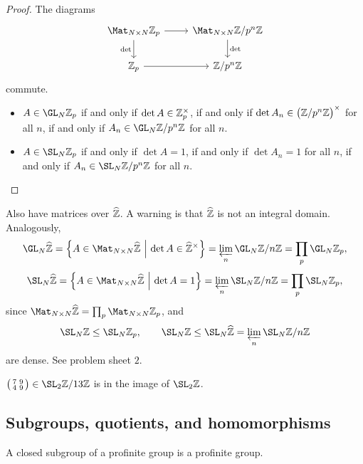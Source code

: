 \begin{proof}
The diagrams
$$
\begin{tikzcd}
\Mat_{N \times N} \ZZ_p \arrow{r} \arrow{d}[swap]{\det} & \Mat_{N \times N} \ZZ / p^n\ZZ \arrow{d}{\det} \\
\ZZ_p \arrow{r} & \ZZ / p^n\ZZ
\end{tikzcd}
$$
commute.
\begin{itemize}
\item $ A \in \GL_N \ZZ_p $ if and only if $ \det A \in \mathbb{Z}_p^\times $, if and only if $ \det A_n \in \br{\ZZ / p^n\ZZ}^\times $ for all $ n $, if and only if $ A_n \in \GL_N \ZZ / p^n\ZZ $ for all $ n $.
\item $ A \in \SL_N \ZZ_p $ if and only if $ \det A = 1 $, if and only if $ \det A_n = 1 $ for all $ n $, if and only if $ A_n \in \SL_N \ZZ / p^n\ZZ $ for all $ n $.
\end{itemize}
\end{proof}

Also have matrices over $ \widehat{\mathbb{Z}} $. A warning is that $ \widehat{\mathbb{Z}} $ is not an integral domain. Analogously,
$$ \GL_N \widehat{\ZZ} = \cbr{A \in \Mat_{N \times N} \widehat{\ZZ} \st \det A \in \widehat{\ZZ}^\times} = \varprojlim_n \GL_N \ZZ / n\ZZ = \prod_p \GL_N \ZZ_p, $$
$$ \SL_N \widehat{\ZZ} = \cbr{A \in \Mat_{N \times N} \widehat{\ZZ} \st \det A = 1} = \varprojlim_n \SL_N \ZZ / n\ZZ = \prod_p \SL_N \ZZ_p, $$
since $ \Mat_{N \times N} \widehat{\ZZ} = \prod_p \Mat_{N \times N} \ZZ_p $, and
$$ \SL_N \ZZ \le \SL_N \ZZ_p, \qquad \SL_N \ZZ \le \SL_N \widehat{\ZZ} = \varprojlim_n \SL_N \ZZ / n\ZZ $$
are dense. See problem sheet $ 2 $.

\begin{example*}
$ \twobytwosmall{7}{9}{4}{9} \in \SL_2 \ZZ / 13\ZZ $ is in the image of $ \SL_2 \ZZ $.
\end{example*}

\pagebreak

\subsection{Subgroups, quotients, and homomorphisms}

\begin{proposition}
A closed subgroup of a profinite group is a profinite group.
\end{proposition}

